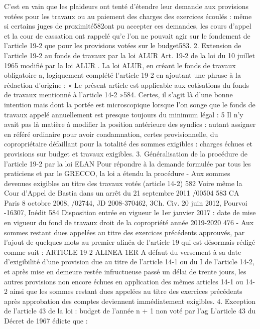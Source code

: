 C’est en vain que les plaideurs ont tenté d’étendre leur demande aux provisions votées pour les travaux ou au paiement des charges des exercices écoulés : même si certains juges de proximité582ont pu accepter ces demandes, les cours d’appel et la cour de cassation ont rappelé qu’e l’on ne pouvait agir sur le fondement de l’article 19-2 que pour les provisions votées sur le budget583.
2. Extension de l’article 19-2 au fonds de travaux par la loi ALUR
Art. 19-2 de la loi du 10 juillet 1965 modifié par la loi ALUR .
La loi ALUR, en créant le fonds de travaux obligatoire a, logiquement complété l’article 19-2 en ajoutant une phrase à la rédaction d’origine :
« Le présent article est applicable aux cotisations du fonds de travaux mentionné à l’article 14-2 »584.
Certes, il s’agit là d’une bonne intention mais dont la portée est microscopique lorsque l’on songe que le fonds de travaux appelé annuellement est presque toujours du minimum légal : 5 %
Il n’y avait pas là matière à modifier la position antérieure des syndics : autant assigner en référé ordinaire pour avoir condamnation, certes provisionnelle, du copropriétaire défaillant pour la totalité des sommes exigibles : charges échues et provisions sur budget et travaux exigibles.
3. Généralisation de la procédure de l’article 19-2 par la loi ELAN
Pour répondre à la demande formulée par tous les praticiens et par le GRECCO, la loi a étendu la procédure
- Aux sommes devenues exigibles au titre des travaux votés (article 14-2)
582 Voire même la Cour d’Appel de Bastia dans un arrêt du 21 septembre 2011 /00504
583 CA Paris 8 octobre 2008, /02744, JD 2008-370462, 3\degres Ch. Civ. 20 juin 2012, Pourvoi -16307, Inédit
584 Disposition entrée en vigueur le 1er janvier 2017 : date de mise en vigueur du fond de travaux
droit de la copropriété année 2019-2020
476
- Aux sommes restant dues appelées au titre des exercices précédents approuvés,
par l’ajout de quelques mots au premier alinéa de l’article 19 qui est désormais rédigé comme suit :
ARTICLE 19-2 ALINEA 1ER
A défaut du versement à sa date d'exigibilité d'une provision due au titre de l'article 14-1 ou du I de l'article 14-2, et après mise en demeure restée infructueuse passé un délai de trente jours, les autres provisions non encore échues en application des mêmes articles 14-1 ou 14-2 ainsi que les sommes restant dues appelées au titre des exercices précédents après approbation des comptes deviennent immédiatement exigibles.
4. Exception de l’article 43 de la loi : budget de l’année n + 1 non voté par l’ag
L’article 43 du Décret de 1967 édicte que :
